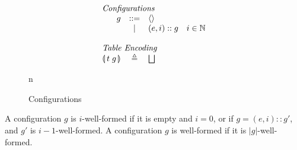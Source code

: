 \begin{figure}[ht]
  \[\begin{array}{r c l l}
      \multicolumn{4}{l}{\textit{Configurations}} \\
      g & ::= & \langle\rangle \\
        & \mid & (e,i)::g & i \in \mathbb N \\\\
      \multicolumn{4}{l}{\textit{Table Encoding}} \\
      \parenbb{t\; g}
        & \triangleq
        & \Angel_{} 
                                   
      
                            
    \end{array}\]

  \caption{Configurations}
  \label{fig:configs}n
  
\end{figure}

A configuration $g$ is $i$-well-formed if it is empty and $i = 0$, or if
$g = (e,i)::g'$, and $g'$ is $i-1$-well-formed. A configuration $g$ is well-formed if it is $|g|$-well-formed.
